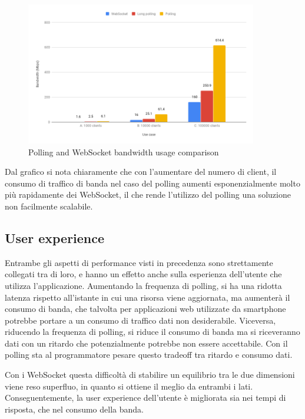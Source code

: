 \documentclass[12pt,a4paper,openright,twoside]{report}
\begin{document}
\begin{figure}[htbp]
\centering
\includegraphics[width=0.9\textwidth]{assets/bandwidth.png}
\caption{Polling and WebSocket bandwidth usage comparison}
\label{fig:bandwidth}
\end{figure}

Dal grafico si nota chiaramente che con l'aumentare del numero di client, il consumo di traffico di banda nel caso del polling aumenti esponenzialmente molto più rapidamente dei WebSocket, il che rende l'utilizzo del polling una soluzione non facilmente scalabile.

\subsection{User experience}
Entrambe gli aspetti di performance visti in precedenza sono strettamente collegati tra di loro, e hanno un effetto anche sulla esperienza dell'utente che utilizza l'applicazione. Aumentando la frequenza di polling, si ha una ridotta latenza rispetto all'istante in cui una risorsa viene aggiornata, ma aumenterà il consumo di banda, che talvolta per applicazioni web utilizzate da smartphone potrebbe portare a un consumo di traffico dati non desiderabile. Viceversa, riducendo la frequenza di polling, si riduce il consumo di banda ma si riceveranno dati con un ritardo che potenzialmente potrebbe non essere accettabile. Con il polling sta al programmatore pesare questo tradeoff tra ritardo e consumo dati.

Con i WebSocket questa difficoltà di stabilire un equilibrio tra le due dimensioni viene reso superfluo, in quanto si ottiene il meglio da entrambi i lati. Conseguentemente, la user experience dell'utente è migliorata sia nei tempi di risposta, che nel consumo della banda.

\end{document}
